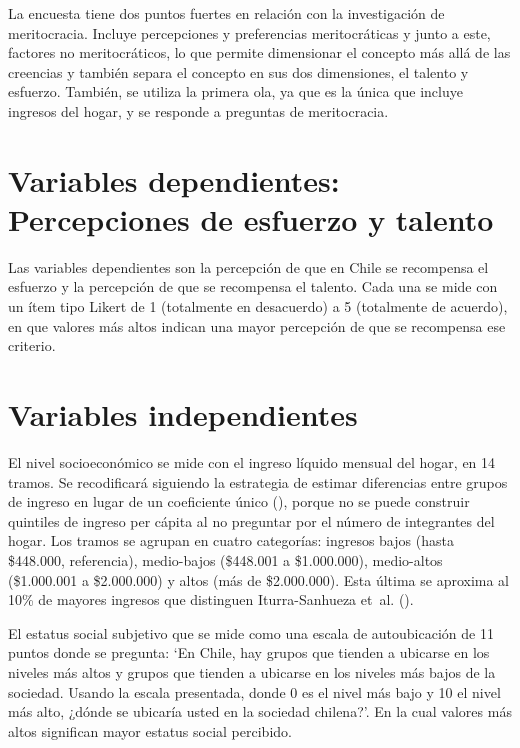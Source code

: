 \documentclass[
  spanish,
  a4paper,
  oneside]{scrbook}
\begin{document}
La encuesta tiene dos puntos fuertes en relación con la investigación de
meritocracia. Incluye percepciones y preferencias meritocráticas y junto
a este, factores no meritocráticos, lo que permite dimensionar el
concepto más allá de las creencias y también separa el concepto en sus
dos dimensiones, el talento y esfuerzo. También, se utiliza la primera
ola, ya que es la única que incluye ingresos del hogar, y se responde a
preguntas de meritocracia.

\section{Variables dependientes: Percepciones de esfuerzo y
talento}\label{variables-dependientes-percepciones-de-esfuerzo-y-talento-1}

Las variables dependientes son la percepción de que en Chile se
recompensa el esfuerzo y la percepción de que se recompensa el talento.
Cada una se mide con un ítem tipo Likert de 1 (totalmente en desacuerdo)
a 5 (totalmente de acuerdo), en que valores más altos indican una mayor
percepción de que se recompensa ese criterio.

\section{Variables independientes}\label{variables-independientes-1}

El nivel socioeconómico se mide con el ingreso líquido mensual del
hogar, en 14 tramos. Se recodificará siguiendo la estrategia de estimar
diferencias entre grupos de ingreso en lugar de un coeficiente único
(), porque no se puede construir quintiles de ingreso per cápita al no
preguntar por el número de integrantes del hogar. Los tramos se agrupan
en cuatro categorías: ingresos bajos (hasta \$448.000, referencia),
medio-bajos (\$448.001 a \$1.000.000), medio-altos (\$1.000.001 a
\$2.000.000) y altos (más de \$2.000.000). Esta última se aproxima al
10\% de mayores ingresos que distinguen Iturra-Sanhueza et~al.
().

El estatus social subjetivo que se mide como una escala de autoubicación
de 11 puntos donde se pregunta: `En Chile, hay grupos que tienden a
ubicarse en los niveles más altos y grupos que tienden a ubicarse en los
niveles más bajos de la sociedad. Usando la escala presentada, donde 0
es el nivel más bajo y 10 el nivel más alto, ¿dónde se ubicaría usted en
la sociedad chilena?'. En la cual valores más altos significan mayor
estatus social percibido.
\end{document}
